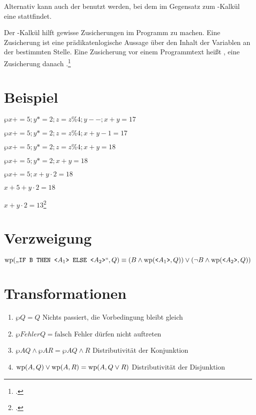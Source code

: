 \documentclass{lehramt-informatik-haupt}
\begin{document}
Alternativ kann auch der  benutzt werden, bei dem im
Gegensatz zum -Kalkül eine  stattfindet.

Der -Kalkül hilft gewisse Zusicherungen im Programm zu machen.
Eine Zusicherung ist eine prädikatenlogische Aussage über den Inhalt der
Variablen an der bestimmten Stelle. Eine Zusicherung vor einem
Programmtext heißt , eine Zusicherung danach
.\footcite{wiki:wp-kalkuel}

%

\section{Beispiel}

$\wp{x += 5; y *= 2; z = z \% 4; y--;}{x + y = 17}$

$\wp{x += 5; y *= 2; z = z \% 4;}{x + y - 1 = 17}$

$\wp{x += 5; y *= 2; z = z \% 4;}{x + y = 18}$

$\wp{x += 5; y *= 2;}{x + y = 18}$

$\wp{x += 5;}{x + y \cdot 2 = 18}$

$x + 5 + y \cdot 2 = 18$

$x + y \cdot 2 = 13$\footcite[Seite 21-26]{sosy:fs:5}

\section{Verzweigung}

$\text{\text{wp}}(\text{„}\texttt{IF B THEN <}A_1\texttt{> ELSE <}A_2\texttt{>}\text{“}, Q)
\equiv
(B \land \text{\text{wp}}(\texttt{<}A_1\texttt{>}, Q))
\lor
(\neg B \land \text{\text{wp}}(\texttt{<}A_2\texttt{>}, Q))$

\section{Transformationen}

\begin{enumerate}
\item $\wp{}{Q} = Q$
Nichts passiert, die Vorbedingung bleibt gleich

\item $\wp{Fehler}{Q} = \text{falsch}$
Fehler dürfen nicht auftreten

\item $\wp{A}{Q} \land \wp{A}{R} = \wp{A}{Q \land R}$
Distributivität der Konjunktion

\item $\text{\text{wp}}(A, Q) \lor \text{\text{wp}}(A, R) = \text{\text{wp}}(A, Q \lor R)$
Distributivität der Disjunktion
\end{enumerate}
\end{document}
